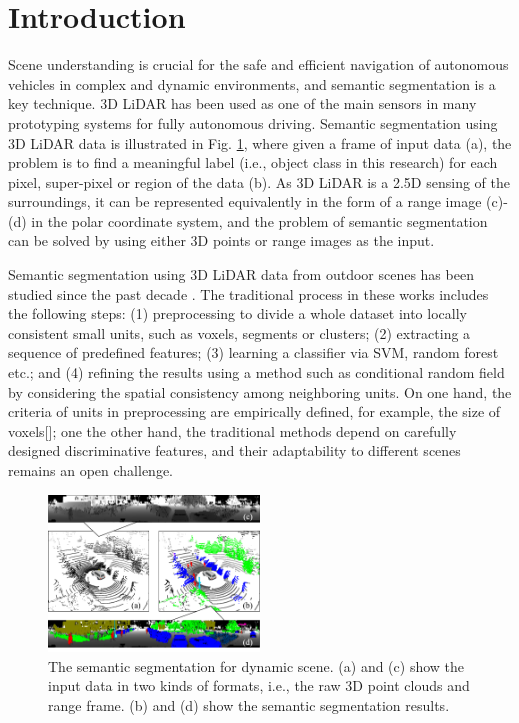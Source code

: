 \section{Introduction}
	Scene understanding is crucial for the safe and efficient navigation of autonomous vehicles in complex and dynamic environments, and semantic segmentation is a key technique. 3D LiDAR has been used as one of the main sensors in many prototyping systems for fully autonomous driving\cite{urmson2008autonomous}. Semantic segmentation using 3D LiDAR data is illustrated in Fig. \ref{fig:dynamiccampus}, where given a frame of input data (a), the problem is to find a meaningful label (i.e., object class in this research) for each pixel, super-pixel or region of the data (b). As 3D LiDAR is a 2.5D sensing of the surroundings, it can be represented equivalently in the form of a range image (c)-(d) in the polar coordinate system, and the problem of semantic segmentation can be solved by using either 3D points or range images as the input.
	
	Semantic segmentation using 3D LiDAR data from outdoor scenes has been studied since the past decade \cite{urmson2008autonomous,moosmann2009segmentation,douillard2011segmentation}. The traditional process in these works \cite{munoz2009onboard,zhao2010scene} includes the following steps: (1) preprocessing to divide a whole dataset into locally consistent small units, such as voxels, segments or clusters; (2) extracting a sequence of predefined features; (3) learning a classifier via SVM, random forest etc.; and (4) refining the results using a method such as conditional random field by considering the spatial consistency among neighboring units. On one hand, the criteria of units in preprocessing are empirically defined, for example, the size of voxels[]; one the other hand, the traditional methods depend on carefully designed discriminative features, and their adaptability to different scenes remains an open challenge.
	
	\begin{figure}
		\centering
		\includegraphics[width=0.5\textwidth]{fig/Fig1.png}
		\caption{The semantic segmentation for dynamic scene. (a) and (c) show the input data in two kinds of formats, i.e., the raw 3D point clouds and range frame. (b) and (d) show the semantic segmentation results.}
		\label{fig:dynamiccampus}
	\end{figure}	
	
